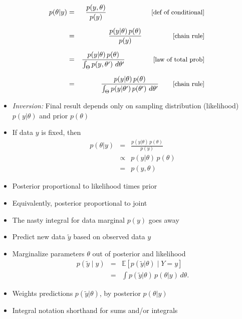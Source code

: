 \documentclass[10pt]{report}
\begin{document}
% 
\vspace*{-4pt}
\begin{eqnarray*}
    p(\theta|y) 
    & = & \frac{p(y,\theta)}{p(y)} 
          \hspace*{64pt} \text{\small [def of conditional]}
    \\[6pt]
    & = & \frac{p(y|\theta) \, p(\theta)}{p(y)}
          \hspace*{44pt} \text{\small [chain rule]}
    \\[6pt]
    & = & \frac{p(y|\theta) \, p(\theta)}{\int_{\Theta} p(y,\theta') \ d\theta'}
          \hspace*{40pt} \text{\small [law of total prob]}
    \\[6pt]
    & = & \frac{p(y|\theta) \, p(\theta)}{\int_{\Theta} p(y|\theta') \,
      p(\theta') \ d\theta'}
          \hspace*{20pt} \text{\small [chain rule]}
\end{eqnarray*}
\vfill
\begin{itemize}
\item \emph{Inversion:} Final result depends only on 
  sampling distribution (likelihood) $p(y|\theta)$ and prior
  $p(\theta)$
\end{itemize}


%
\begin{itemize}
\item If data $y$ is fixed, then
\begin{eqnarray*}
p(\theta|y) 
& = & \frac{p(y|\theta) \, p(\theta)}{p(y)}
\\[6pt]
& \propto & p(y|\theta) \, p(\theta) 
\\[6pt]
& = & p(y,\theta)
\end{eqnarray*}
\item Posterior proportional to likelihood times prior
\item Equivalently, posterior proportional to joint
\vfill
\item The nasty integral for data marginal $p(y)$ goes away
\end{itemize}


%
\begin{itemize}
\item Predict new data $\tilde{y}$ based on observed data $y$
\item Marginalize parameters $\theta$ out of posterior and likelihood
\begin{eqnarray*}
p(\tilde{y} \mid y)
& = & \mathbb{E}[p(\tilde{y} | \theta) \mid Y = y]
\\[6pt]
& = &
\int p(\tilde{y} | \theta) \, p(\theta | y) \, d\theta.
\end{eqnarray*}
\item Weights predictions $p(\tilde{y}|\theta)$,
by posterior $p(\theta|y)$
\item Integral notation shorthand for sums and/or integrals
\end{itemize}
\end{document}
